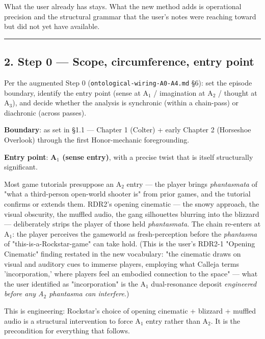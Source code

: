 \documentclass[11pt]{report}
\begin{document}
What the user already has stays. What the new method adds is operational precision and the structural grammar that the user's notes were reaching toward but did not yet have available.


\vspace{0.4em}\hrule\vspace{0.8em}


\subsection{2. Step 0 — Scope, circumference, entry point}


Per the augmented Step 0 (\texttt{ontological-\discretionary{}{}{}wiring-\discretionary{}{}{}A0-\discretionary{}{}{}A4.\discretionary{}{}{}md} §6): set the episode boundary, identify the entry point (sense at A$_1$ / imagination at A$_2$ / thought at A$_3$), and decide whether the analysis is synchronic (within a chain-pass) or diachronic (across passes).


\textbf{Boundary}: as set in §1.1 — Chapter 1 (Colter) + early Chapter 2 (Horseshoe Overlook) through the first Honor-mechanic foregrounding.


\textbf{Entry point}: \textbf{A$_1$ (sense entry)}, with a precise twist that is itself structurally significant.


Most game tutorials presuppose an A$_2$ entry — the player brings \textit{phantasmata} of "what a third-person open-world shooter is" from prior games, and the tutorial confirms or extends them. RDR2's opening cinematic — the snowy approach, the visual obscurity, the muffled audio, the gang silhouettes blurring into the blizzard — deliberately strips the player of those held \textit{phantasmata}. The chain re-enters at A$_1$: the player perceives the gameworld as fresh-perception before the \textit{phantasma} of "this-is-a-Rockstar-game" can take hold. (This is the user's RDR2-1 "Opening Cinematic" finding restated in the new vocabulary: "the cinematic draws on visual and auditory cues to immerse players, employing what Calleja terms 'incorporation,' where players feel an embodied connection to the space" — what the user identified as "incorporation" is the A$_1$ dual-resonance deposit \textit{engineered before any A$_2$ phantasma can interfere}.)


This is engineering: Rockstar's choice of opening cinematic + blizzard + muffled audio is a structural intervention to force A$_1$ entry rather than A$_2$. It is the precondition for everything that follows.
\end{document}
